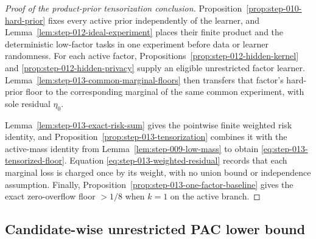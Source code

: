 \begin{proof}[Proof of the product-prior tensorization conclusion]
Proposition~\ref{prop:step-010-hard-prior} fixes every active prior
independently of the learner, and
Lemma~\ref{lem:step-012-ideal-experiment} places their finite product
and the deterministic low-factor tasks in one experiment before data
or learner randomness.  For each active factor,
Propositions~\ref{prop:step-012-hidden-kernel} and
\ref{prop:step-012-hidden-privacy} supply an eligible unrestricted
factor learner.  Lemma~\ref{lem:step-013-common-marginal-floors} then
transfers that factor's hard-prior floor to the corresponding marginal
of the same common experiment, with sole residual \(\eta_0\).

Lemma~\ref{lem:step-013-exact-risk-sum} gives the pointwise finite
weighted risk identity, and
Proposition~\ref{prop:step-013-tensorization} combines it with the
active-mass identity from Lemma~\ref{lem:step-009-low-mass} to obtain
\eqref{eq:step-013-tensorized-floor}.  Equation
\eqref{eq:step-013-weighted-residual} records that each marginal loss
is charged once by its weight, with no union bound or independence
assumption.  Finally,
Proposition~\ref{prop:step-013-one-factor-baseline} gives the exact
zero-overflow floor \(>1/8\) when \(k=1\) on the active branch.
\end{proof}

\subsection{Candidate-wise unrestricted PAC lower bound}
\label{app:step-014}


